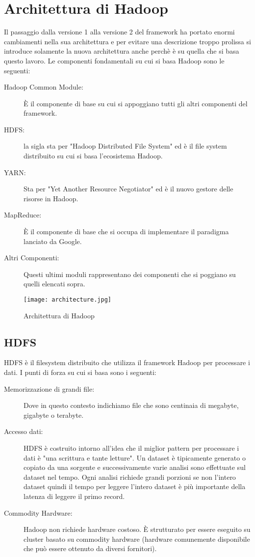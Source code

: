 \section{Architettura di Hadoop}
Il passaggio dalla versione 1 alla versione 2 del framework ha portato enormi cambiamenti nella sua architettura e per evitare una descrizione troppo prolissa si introduce solamente la nuova architettura anche perchè è su quella che si basa questo lavoro. Le componenti fondamentali su cui si basa Hadoop sono le seguenti:
\begin{description}
  \item[Hadoop Common Module:] È il componente di base su cui si appoggiano tutti gli altri componenti del framework.
  \item[HDFS:] la sigla sta per "Hadoop Distributed File System" ed è il file system distribuito su cui si basa l'ecosistema Hadoop.
  \item[YARN:] Sta per "Yet Another Resource Negotiator" ed è il nuovo gestore delle risorse in Hadoop.
  \item[MapReduce:] È il componente di base che si occupa di implementare il paradigma lanciato da Google.
  \item[Altri Componenti:] Questi ultimi moduli rappresentano dei componenti che si poggiano su quelli elencati sopra.
\end{description}
\begin{figure}[H]
  \begin{center}
    \texttt{[image: architecture.jpg]}
    \caption{Architettura di Hadoop}
    \label{fg:architecture.jpg}
  \end{center}
\end{figure}
\subsection{HDFS}
HDFS è il filesystem distribuito che utilizza il framework Hadoop per processare i dati. I punti di forza su cui si basa sono i seguenti:
\begin{description}
  \item[Memorizzazione di grandi file:] Dove in questo contesto indichiamo file che sono centinaia di megabyte, gigabyte o terabyte.
  \item[Accesso dati:] HDFS è costruito intorno all'idea che il miglior pattern per processare i dati è "una scrittura e tante letture". Un dataset è tipicamente generato o copiato da una sorgente e successivamente varie analisi sono effettuate sul dataset nel tempo. Ogni analisi richiede grandi porzioni se non l'intero dataset quindi il tempo per leggere l'intero dataset è più importante della latenza di leggere il primo record.
  \item[Commodity Hardware:]Hadoop non richiede hardware costoso. È strutturato per essere eseguito su cluster basato su commodity hardware (hardware comunemente disponibile che può essere ottenuto da diversi fornitori).
\end{description}
